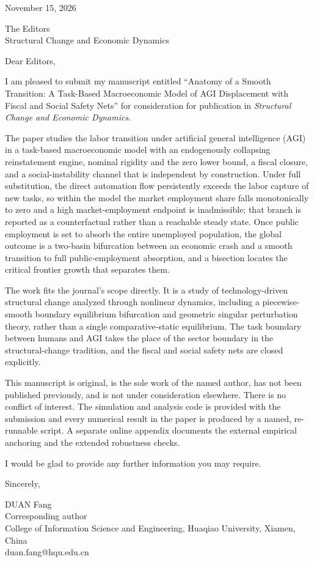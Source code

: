 \documentclass[11pt]{article}
\begin{document}
\hfill November 15, 2026

\vspace{0.5em}

The Editors\\
Structural Change and Economic Dynamics

\vspace{0.8em}

Dear Editors,

I am pleased to submit my manuscript entitled ``Anatomy of a Smooth Transition:
A Task-Based Macroeconomic Model of AGI Displacement with Fiscal and Social
Safety Nets'' for consideration for publication in \emph{Structural Change and
Economic Dynamics}.

The paper studies the labor transition under artificial general intelligence
(AGI) in a task-based macroeconomic model with an endogenously collapsing
reinstatement engine, nominal rigidity and the zero lower bound, a fiscal
closure, and a social-instability channel that is independent by construction.
Under full substitution, the direct automation flow persistently exceeds the
labor capture of new tasks, so within the model the market employment share
falls monotonically to zero and a high market-employment endpoint is
inadmissible; that branch is reported as a counterfactual rather than a
reachable steady state. Once public
employment is set to absorb the entire unemployed population, the global
outcome is a two-basin bifurcation between an economic crash and a smooth
transition to full public-employment absorption, and a bisection locates the
critical frontier growth that separates them.

The work fits the journal's scope directly. It is a study of technology-driven
structural change analyzed through nonlinear dynamics, including a
piecewise-smooth boundary equilibrium bifurcation and geometric singular
perturbation theory, rather than a single comparative-static equilibrium. The
task boundary between humans and AGI takes the place of the sector boundary in
the structural-change tradition, and the fiscal and social safety nets are
closed explicitly.

This manuscript is original, is the sole work of the named author, has not been
published previously, and is not under consideration elsewhere. There is no
conflict of interest. The simulation and analysis code is provided with the
submission and every numerical result in the paper is produced by a named,
re-runnable script. A separate online appendix documents the external
empirical anchoring and the extended robustness checks.

I would be glad to provide any further information you may require.

Sincerely,

\vspace{1.2em}

DUAN Fang\\
Corresponding author\\
College of Information Science and Engineering, Huaqiao University,
Xiamen, China\\
duan.fang@hqu.edu.cn
\end{document}
